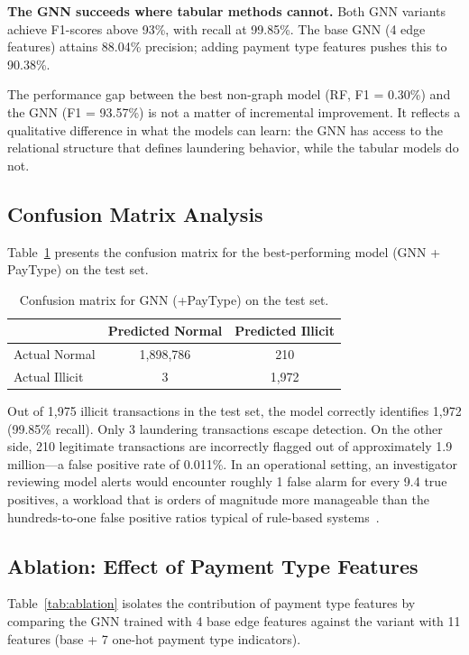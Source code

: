 \documentclass[conference]{IEEEtran}
\begin{document}
\textbf{The GNN succeeds where tabular methods cannot.} Both GNN variants achieve F1-scores above 93\%, with recall at 99.85\%. The base GNN (4 edge features) attains 88.04\% precision; adding payment type features pushes this to 90.38\%.

The performance gap between the best non-graph model (RF, F1 = 0.30\%) and the GNN (F1 = 93.57\%) is not a matter of incremental improvement. It reflects a qualitative difference in what the models can learn: the GNN has access to the relational structure that defines laundering behavior, while the tabular models do not.

\subsection{Confusion Matrix Analysis}

Table~\ref{tab:confusion} presents the confusion matrix for the best-performing model (GNN + PayType) on the test set.

\begin{table}[htbp]
\caption{Confusion matrix for GNN (+PayType) on the test set.}
\label{tab:confusion}
\centering
\begin{tabular}{@{}lcc@{}}
\toprule
 & Predicted Normal & Predicted Illicit \\
\midrule
Actual Normal & 1{,}898{,}786 & 210 \\
Actual Illicit & 3 & 1{,}972 \\
\bottomrule
\end{tabular}
\end{table}

Out of 1{,}975 illicit transactions in the test set, the model correctly identifies 1{,}972 (99.85\% recall). Only 3 laundering transactions escape detection. On the other side, 210 legitimate transactions are incorrectly flagged out of approximately 1.9 million---a false positive rate of 0.011\%. In an operational setting, an investigator reviewing model alerts would encounter roughly 1 false alarm for every 9.4 true positives, a workload that is orders of magnitude more manageable than the hundreds-to-one false positive ratios typical of rule-based systems~\cite{deloitte2020aml}.

\subsection{Ablation: Effect of Payment Type Features}

Table~\ref{tab:ablation} isolates the contribution of payment type features by comparing the GNN trained with 4 base edge features against the variant with 11 features (base + 7 one-hot payment type indicators).
\end{document}
